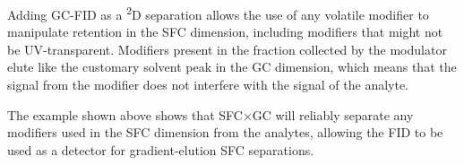 Adding GC-FID as a \textsuperscript{2}D separation allows the use of any
volatile modifier to manipulate retention in the SFC dimension, including
modifiers that might not be UV-transparent. Modifiers present in the fraction
collected by the modulator elute like the customary solvent peak in the GC
dimension, which means that the signal from the modifier does not interfere with
the signal of the analyte.

The example shown above shows that SFC×GC will reliably separate any modifiers
used in the SFC dimension from the analytes, allowing the FID to be used as a
detector for gradient-elution SFC separations.

